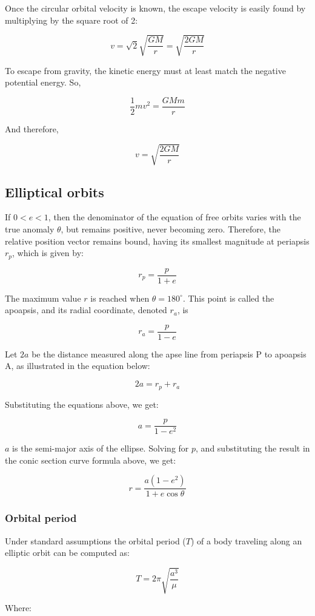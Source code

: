 \documentclass[12pt]{article}
\begin{document}
Once the circular orbital velocity is known, the escape velocity is easily found by multiplying by the square root of 2:

\[v=\sqrt{2}\sqrt{\frac{GM}{r}}=\sqrt{\frac{2GM}{r}}\]

To escape from gravity, the kinetic energy must at least match the negative potential energy. So,

\[\frac{1}{2}mv^{2}=\frac{GMm}{r}\]

And therefore,

\[v=\sqrt{\frac{2GM}{r}}\]

\subsection{Elliptical orbits}

If \(0<e<1\), then the denominator of the equation of free orbits varies with the true anomaly \(\theta\), but remains positive, never becoming zero. Therefore, the relative position vector remains bound, having its smallest magnitude at periapsis \(r_{p}\), which is given by:

\[r_{p}=\frac{p}{1+e}\]

The maximum value \(r\) is reached when \(\theta=180^{\circ}\). This point is called the apoapsis, and its radial coordinate, denoted \(r_{a}\), is

\[r_{a}=\frac{p}{1-e}\]

Let \(2a\) be the distance measured along the apse line from periapsis P to apoapsis A, as illustrated in the equation below:

\[2a=r_p+r_a\]

Substituting the equations above, we get:

\[a=\frac{p}{1-e^2}\]

\(a\) is the semi-major axis of the ellipse. Solving for \(p\), and substituting the result in the conic section curve formula above, we get:

\[r=\frac{a(1-e^2)}{1+e\cos\theta}\]

\subsubsection{Orbital period}

Under standard assumptions the orbital period (\(T\)) of a body traveling along an elliptic orbit can be computed as:

\[T=2\pi\sqrt{\frac{a^3}{\mu}}\]

Where:
\end{document}
